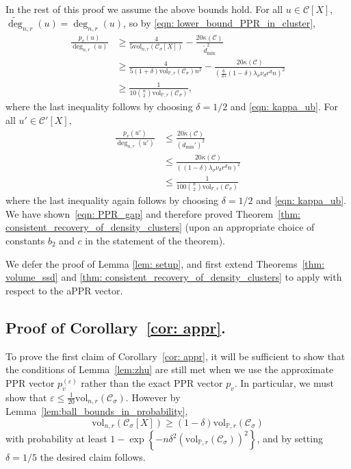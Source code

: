\documentclass[11pt,twoside]{article}
\newcommand{\set}[1]{\left\{#1\right\}}
\newcommand{\vol}{\mathrm{vol}}
\newcommand{\1}{\mathbbm{1}}
\newcommand{\Xbf}{X}
\newcommand{\Pbb}{\mathbb{P}}
\newcommand{\Cset}{\mathcal{C}}
\newcommand{\Csig}{\Cset_{\sigma}}
\begin{document}
In the rest of this proof we assume the above bounds hold. For all $u \in \Cset[\Xbf]$, $\widetilde{\deg}_{n,r}(u) = \deg_{n,r}(u)$, so by \eqref{eqn: lower_bound_PPR_in_cluster},
\begin{align*}
\frac{p_v(u)}{\deg_{n,r}(u)} & \geq \frac{4}{5 \vol_{n,r}(\Csig[\Xbf])} - \frac{20 \kappa(\Cset)}{\widetilde{d}_{\min}^2} \\
& \geq \frac{4}{5(1+\delta)\vol_{\Pbb,r}(\Csig)n^2} - \frac{20\kappa(\Cset)}{\left(\frac{6}{25}(1 - \delta)\lambda_{\sigma}\nu_dr^dn\right)^2} \\
& \geq \frac{1}{10{n \choose 2}\vol_{\Pbb,r}(\Csig)},
\end{align*}
where the last inequality follows by choosing $\delta = 1/2$ and \eqref{eqn: kappa_ub}. For all $u' \in \Cset'[\Xbf]$, 
\begin{align}
\frac{p_v(u')}{\deg_{n,r}(u')} & \leq \frac{20\kappa(\Cset)}{(d_{\min}')^2} \nonumber \\
& \leq \frac{20\kappa(\Cset)}{\left((1 - \delta)\lambda_{\sigma}\nu_dr^dn\right)^2} \nonumber \\
& \leq \frac{1}{100{n \choose 2}\vol_{\Pbb,r}(\Csig)} \label{eqn:consistent_recovery_of_density_clusters_pf1}
\end{align}
where the last inequality again follows by choosing $\delta = 1/2$ and \eqref{eqn: kappa_ub}. We have shown~\eqref{eqn: PPR_gap} and therefore proved Theorem~\ref{thm: consistent_recovery_of_density_clusters} (upon an appropriate choice of constants $b_2$ and $c$ in the statement of the theorem).


We defer the proof of Lemma \ref{lem: setup}, and first extend Theorems~\ref{thm: volume_ssd} and \ref{thm: consistent_recovery_of_density_clusters} to apply with respect to the aPPR vector.

\subsection{Proof of Corollary~\ref{cor: appr}.}
\label{sec:appr}
To prove the first claim of Corollary~\ref{cor: appr}, it will be sufficient to show that the conditions of Lemma~\ref{lem:zhu} are still met when we use the approximate PPR vector $p^{(\varepsilon)}_v$ rather than the exact PPR vector $p_v$. In particular, we must show that $\varepsilon \leq \frac{1}{20}\vol_{n,r}(\Csig)$. However by Lemma~\ref{lem:ball_bounds_in_probability},
\begin{equation}
\label{eqn:appr_pf1}
\vol_{n,r}(\Csig[\Xbf]) \geq (1 - \delta)\vol_{\Pbb,r}(\Csig)
\end{equation}
with probability at least $1 - \exp\set{-n \delta^2 (\vol_{\Pbb,r}(\Csig))^2}$, and by setting $\delta = 1/5$ the desired claim follows.
\end{document}
